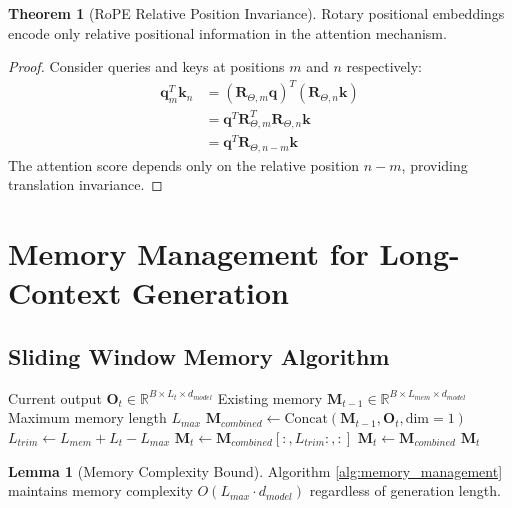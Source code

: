 \documentclass[12pt]{article}
\theoremstyle{definition}
\newtheorem{lemma}{Lemma}
\newtheorem{theorem}{Theorem}
\begin{document}
\begin{theorem}[RoPE Relative Position Invariance]
Rotary positional embeddings encode only relative positional information in the attention mechanism.
\end{theorem}

\begin{proof}
Consider queries and keys at positions $m$ and $n$ respectively:
\begin{align}
\mathbf{q}_m^T \mathbf{k}_n &= (\mathbf{R}_{\Theta, m} \mathbf{q})^T (\mathbf{R}_{\Theta, n} \mathbf{k}) \\
&= \mathbf{q}^T \mathbf{R}_{\Theta, m}^T \mathbf{R}_{\Theta, n} \mathbf{k} \\
&= \mathbf{q}^T \mathbf{R}_{\Theta, n-m} \mathbf{k}
\end{align}
The attention score depends only on the relative position $n-m$, providing translation invariance.
\end{proof}

\section{Memory Management for Long-Context Generation}

\subsection{Sliding Window Memory Algorithm}

\begin{algorithm}[H]
\caption{Adaptive Memory Management}
\label{alg:memory_management}
\begin{algorithmic}[1]
\REQUIRE Current output $\mathbf{O}_t \in \mathbb{R}^{B \times L_t \times d_{model}}$
\REQUIRE Existing memory $\mathbf{M}_{t-1} \in \mathbb{R}^{B \times L_{mem} \times d_{model}}$
\REQUIRE Maximum memory length $L_{max}$
\STATE $\mathbf{M}_{combined} \leftarrow \text{Concat}(\mathbf{M}_{t-1}, \mathbf{O}_t, \text{dim}=1)$
    \STATE $L_{trim} \leftarrow L_{mem} + L_t - L_{max}$
    \STATE $\mathbf{M}_t \leftarrow \mathbf{M}_{combined}[:, L_{trim}:, :]$ 
\ELSE
    \STATE $\mathbf{M}_t \leftarrow \mathbf{M}_{combined}$
\ENDIF
\RETURN $\mathbf{M}_t$
\end{algorithmic}
\end{algorithm}

\begin{lemma}[Memory Complexity Bound]
Algorithm \ref{alg:memory_management} maintains memory complexity $O(L_{max} \cdot d_{model})$ regardless of generation length.
\end{lemma}
\end{document}
